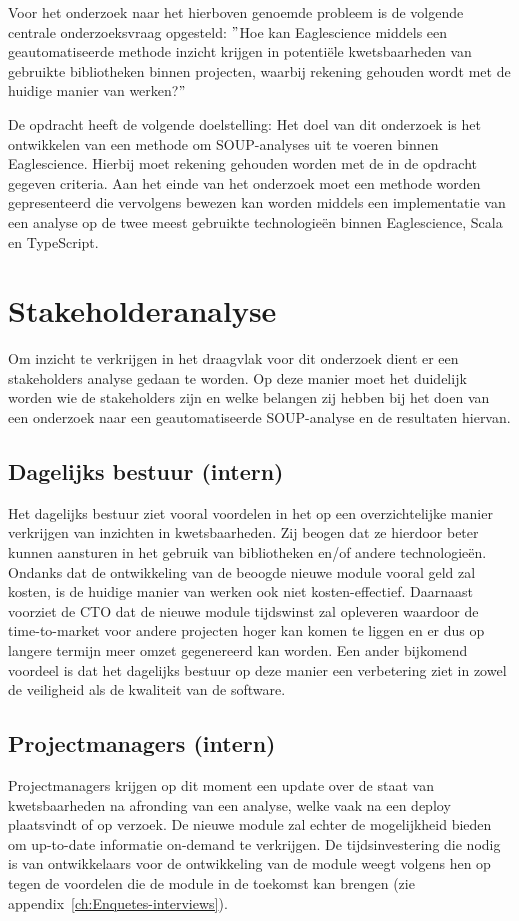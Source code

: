 Voor het onderzoek naar het hierboven genoemde probleem is de volgende centrale onderzoeksvraag opgesteld: $"$Hoe kan Eaglescience middels een geautomatiseerde methode inzicht krijgen in potentiële kwetsbaarheden van gebruikte bibliotheken binnen projecten, waarbij rekening gehouden wordt met de huidige manier van werken?$"$

De opdracht heeft de volgende doelstelling:
Het doel van dit onderzoek is het ontwikkelen van een methode om SOUP-analyses uit te voeren binnen Eaglescience. Hierbij moet rekening gehouden worden met de in de opdracht gegeven criteria. Aan het einde van het onderzoek moet een methode worden gepresenteerd die vervolgens bewezen kan worden middels een implementatie van een analyse op de twee meest gebruikte technologieën binnen Eaglescience, Scala en TypeScript.


\section{Stakeholderanalyse}\label{sec:stakeholdersanalyse}
Om inzicht te verkrijgen in het draagvlak voor dit onderzoek dient er een stakeholders analyse gedaan te worden. Op deze manier moet het duidelijk worden wie de stakeholders zijn en welke belangen zij hebben bij het doen van een onderzoek naar een geautomatiseerde SOUP-analyse en de resultaten hiervan.

\subsection{Dagelijks bestuur (intern)}\label{subsec:dagelijks-bestuur-(intern)}
Het dagelijks bestuur ziet vooral voordelen in het op een overzichtelijke manier verkrijgen van inzichten in kwetsbaarheden. Zij beogen dat ze hierdoor beter kunnen aansturen in het gebruik van bibliotheken en/of andere technologieën. Ondanks dat de ontwikkeling van de beoogde nieuwe module vooral geld zal kosten, is de huidige manier van werken ook niet kosten-effectief. Daarnaast voorziet de CTO dat de nieuwe module tijdswinst zal opleveren waardoor de time-to-market voor andere projecten hoger kan komen te liggen en er dus op langere termijn meer omzet gegenereerd kan worden. Een ander bijkomend voordeel is dat het dagelijks bestuur op deze manier een verbetering ziet in zowel de veiligheid als de kwaliteit van de software.

\subsection{Projectmanagers (intern)}\label{subsec:projectmanagers-(intern)}
Projectmanagers krijgen op dit moment een update over de staat van kwetsbaarheden na afronding van een analyse, welke vaak na een deploy plaatsvindt of op verzoek. De nieuwe module zal echter de mogelijkheid bieden om up-to-date informatie on-demand te verkrijgen.
De tijdsinvestering die nodig is van ontwikkelaars voor de ontwikkeling van de module weegt volgens hen op tegen de voordelen die de module in de toekomst kan brengen (zie appendix~\ref{ch:Enquetes-interviews}).

